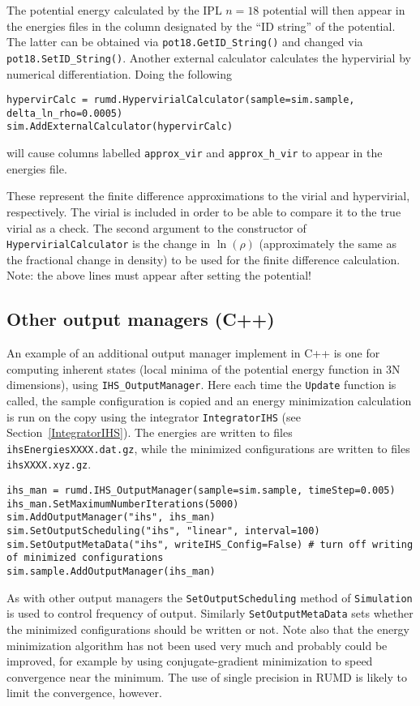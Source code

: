 \documentclass[a4paper]{article}
\begin{document}
The potential energy calculated by the IPL $n=18$ potential will then appear
in the energies files in the column designated by the ``ID string'' of the
potential. The latter can be obtained via \verb|pot18.GetID_String()|
and changed via \verb|pot18.SetID_String()|. Another external calculator 
calculates the hypervirial by numerical differentiation. Doing the following


\begin{verbatim}
hypervirCalc = rumd.HypervirialCalculator(sample=sim.sample, delta_ln_rho=0.0005)
sim.AddExternalCalculator(hypervirCalc)
\end{verbatim}
will cause columns labelled \verb|approx_vir| and \verb|approx_h_vir| to appear
in the energies file. 

These represent the finite difference approximations to the
virial and hypervirial, respectively. The virial is included in order to be 
able
to compare it to the true virial as a check. The second argument to the 
constructor of \verb|HypervirialCalculator| is the change in $\ln(\rho)$
(approximately the same as the fractional change in density) to be used for the
finite difference calculation.
Note: the above lines must appear after setting the potential! 


\subsection{Other output managers (C++)\label{other_output_managers}}

An example of an additional output manager implement in C++ is one
for computing inherent states (local minima of the potential energy function in
3N dimensions), using \verb|IHS_OutputManager|. 
Here each time the \verb|Update| function is called, the sample configuration is
copied and an energy minimization calculation is run on the copy using the 
integrator \verb|IntegratorIHS| (see Section~\ref{IntegratorIHS}). 
The energies are written to files \verb|ihsEnergiesXXXX.dat.gz|, while the 
minimized configurations are written to files \verb|ihsXXXX.xyz.gz|.
\begin{verbatim}
ihs_man = rumd.IHS_OutputManager(sample=sim.sample, timeStep=0.005)
ihs_man.SetMaximumNumberIterations(5000)
sim.AddOutputManager("ihs", ihs_man)
sim.SetOutputScheduling("ihs", "linear", interval=100)
sim.SetOutputMetaData("ihs", writeIHS_Config=False) # turn off writing of minimized configurations
sim.sample.AddOutputManager(ihs_man)
\end{verbatim}
As with other output managers the \verb|SetOutputScheduling| method of 
\verb|Simulation| is used to control frequency of output. Similarly \verb|SetOutputMetaData| sets whether the minimized configurations should be written or not.
Note also that the energy minimization algorithm has not been used very much and probably could be improved, for example by using conjugate-gradient minimization to speed convergence near the minimum. The use of single precision in RUMD is likely to limit the convergence, however.
\end{document}
